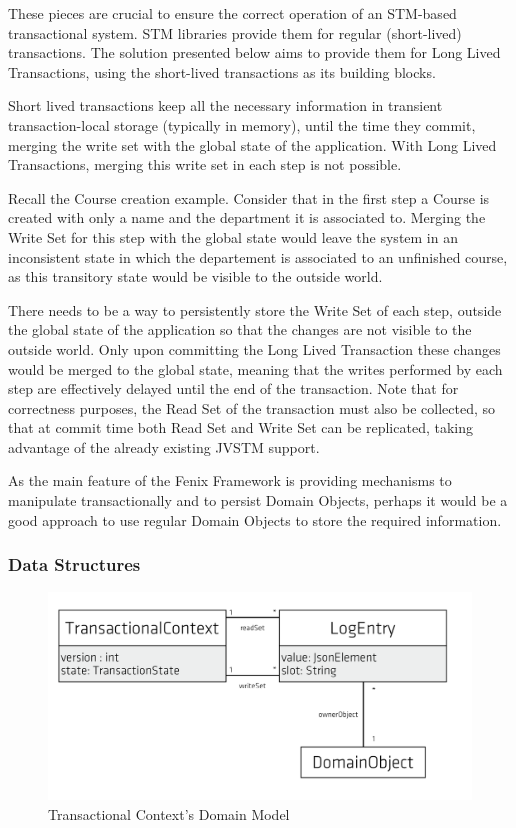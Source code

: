 \documentclass{llncs}
\begin{document}
These pieces are crucial to ensure the correct operation of an
STM-based transactional system. STM libraries provide them for regular
(short-lived) transactions. The solution presented below aims to
provide them for Long Lived Transactions, using the short-lived
transactions as its building blocks.

Short lived transactions keep all the necessary information in
transient transaction-local storage (typically in memory), until the
time they commit, merging the write set with the global state of the
application. With Long Lived Transactions, merging this write set in
each step is not possible.

Recall the Course creation example. Consider that in the first step a
Course is created with only a name and the department it is associated
to. Merging the Write Set for this step with the global state would
leave the system in an inconsistent state in which the departement is
associated to an unfinished course, as this transitory state would be
visible to the outside world.

There needs to be a way to persistently store the Write Set of each
step, outside the global state of the application so that the changes
are not visible to the outside world. Only upon committing the Long
Lived Transaction these changes would be merged to the global state,
meaning that the writes performed by each step are effectively delayed
until the end of the transaction. Note that for correctness purposes,
the Read Set of the transaction must also be collected, so that at
commit time both Read Set and Write Set can be replicated, taking
advantage of the already existing JVSTM support.

As the main feature of the Fenix Framework is providing mechanisms to
manipulate transactionally and to persist Domain Objects, perhaps it
would be a good approach to use regular Domain Objects to store the
required information.

\subsubsection{Data Structures}

\begin{figure}
\centering
\includegraphics[width=0.8\linewidth]{tx-context}
\caption{Transactional Context's Domain Model}
\label{fig:transactionalContext}
\end{figure}
\end{document}
